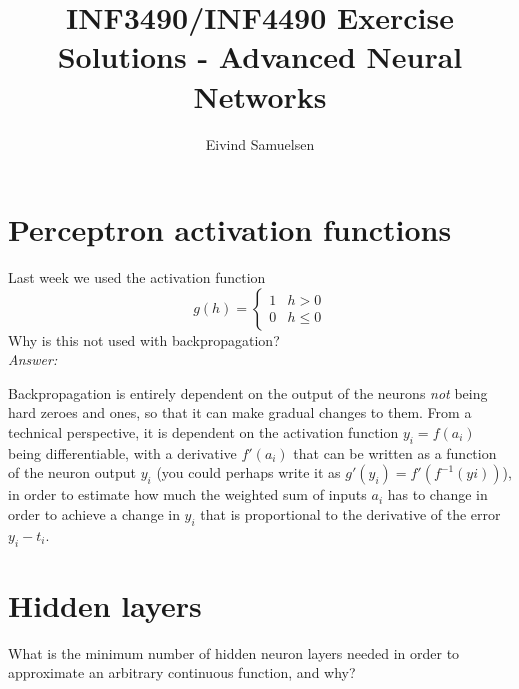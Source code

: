 
\title{\vspace{-2cm}INF3490/INF4490 Exercise Solutions - Advanced Neural Networks}
\author{Eivind Samuelsen}
\date{}



    \renewcommand\marginsymbol[1][0pt]{%
  \tabto*{0cm}\makebox[-1cm][c]{$\mathbb{P}$}\tabto*{\TabPrevPos}}

\maketitle


\section{Perceptron activation functions}
Last week we used the activation function
\begin{equation}
g(h) =
\begin{cases}
1 & h > 0 \\
0 & h \leq 0
\end{cases}
\end{equation}
Why is this not used with backpropagation?\\

\noindent\textit{Answer:}

\noindent
Backpropagation is entirely dependent on the output of the neurons \emph{not} being hard zeroes and ones, so that it can make gradual changes to them.
From a technical perspective, it is dependent on the activation function \(y_i = f(a_i)\) being differentiable, with a derivative \(f'(a_i)\) that can be written as a function of the neuron output \(y_i\) (you could perhaps write it as \(g'(y_i) = f'(f^{-1}(yi))\)), in order to estimate how much the weighted sum of inputs \(a_i\) has to change in order to achieve a change in \(y_i\) that is proportional to the derivative of the error \(y_i - t_i\).

\section{Hidden layers}
What is the minimum number of hidden neuron layers needed in order to approximate an arbitrary continuous function, and why?\\

